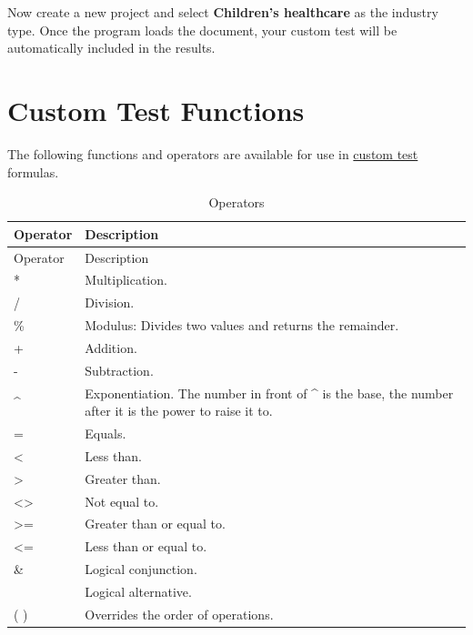\documentclass[
]{book}
\theoremstyle{definition}
\theoremstyle{definition}
\theoremstyle{definition}
\theoremstyle{definition}
\theoremstyle{remark}
\begin{document}
Now create a new project and select \textbf{Children's healthcare} as the industry type. Once the program loads the document, your custom test will be automatically included in the results.

\hypertarget{custom-test-functions}{%
\section{Custom Test Functions}\label{custom-test-functions}}

The following functions and operators are available for use in \protect\hyperlink{creating-custom-test}{custom test} formulas.

\begin{minipage}{\textwidth}

\begin{longtable}[]{@{}
  >{\raggedright\arraybackslash}p{}
  >{\raggedright\arraybackslash}p{}@{}}
\caption{Operators}\tabularnewline
\toprule
Operator & Description \\
\midrule
\endfirsthead
\toprule
Operator & Description \\
\midrule
\endhead
* & Multiplication. \\
/ & Division. \\
\% & Modulus: Divides two values and returns the remainder. \\
+ & Addition. \\
- & Subtraction. \\
\^{} & Exponentiation. The number in front of \^{} is the base, the number after it is the power to raise it to. \\
= & Equals. \\
\textless{} & Less than. \\
\textgreater{} & Greater than. \\
\textless\textgreater{} & Not equal to. \\
\textgreater= & Greater than or equal to. \\
\textless= & Less than or equal to. \\
\& & Logical conjunction. \\
\textbar{} & Logical alternative. \\
( ) & Overrides the order of operations. \\
\bottomrule
\end{longtable}

\end{minipage}
\end{document}
